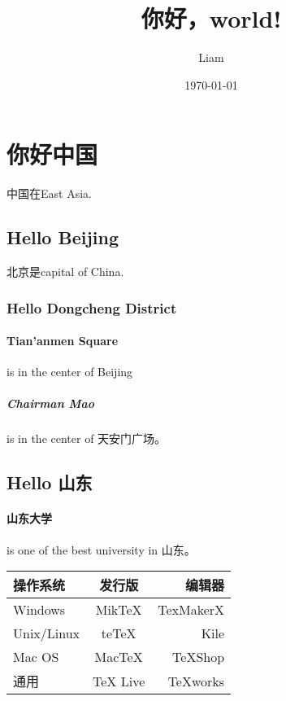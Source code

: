 \documentclass[UTF8]{ctexart}
\title{你好，world!}
\author{Liam}
\date{\today}
\begin{document}
\maketitle
\tableofcontents
\section{你好中国}
中国在East Asia.
\subsection{Hello Beijing}
北京是capital of China.
\subsubsection{Hello Dongcheng District}
\paragraph{Tian'anmen Square}
is in the center of Beijing
\subparagraph{Chairman Mao}
is in the center of 天安门广场。
\subsection{Hello 山东}
\paragraph{山东大学} is one of the best university in 山东。
\begin{tabular}{|l|c|r|}
    \hline
   操作系统& 发行版& 编辑器\\
    \hline
   Windows & MikTeX & TexMakerX \\
    \hline
   Unix/Linux & teTeX & Kile \\
    \hline
   Mac OS & MacTeX & TeXShop \\
    \hline
   通用& TeX Live & TeXworks \\
    \hline
   \end{tabular}
\end{document}

